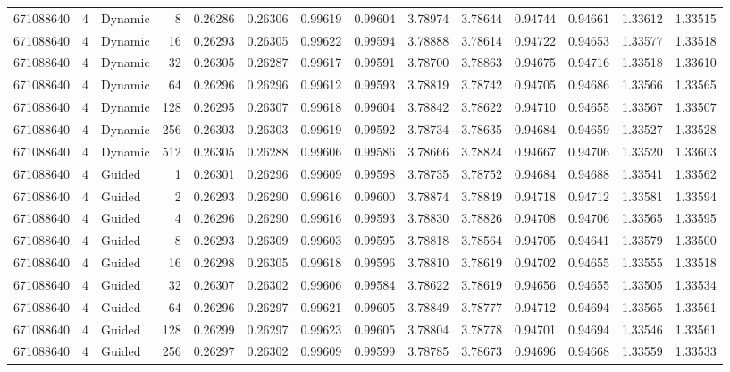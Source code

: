 \begin{tabular}{rrlrrrrrrrrrrr}
671088640 & 4 & Dynamic & 8 & 0.26286 & 0.26306 & 0.99619 & 0.99604 & 3.78974 & 3.78644 & 0.94744 & 0.94661 & 1.33612 & 1.33515 \\
671088640 & 4 & Dynamic & 16 & 0.26293 & 0.26305 & 0.99622 & 0.99594 & 3.78888 & 3.78614 & 0.94722 & 0.94653 & 1.33577 & 1.33518 \\
671088640 & 4 & Dynamic & 32 & 0.26305 & 0.26287 & 0.99617 & 0.99591 & 3.78700 & 3.78863 & 0.94675 & 0.94716 & 1.33518 & 1.33610 \\
671088640 & 4 & Dynamic & 64 & 0.26296 & 0.26296 & 0.99612 & 0.99593 & 3.78819 & 3.78742 & 0.94705 & 0.94686 & 1.33566 & 1.33565 \\
671088640 & 4 & Dynamic & 128 & 0.26295 & 0.26307 & 0.99618 & 0.99604 & 3.78842 & 3.78622 & 0.94710 & 0.94655 & 1.33567 & 1.33507 \\
671088640 & 4 & Dynamic & 256 & 0.26303 & 0.26303 & 0.99619 & 0.99592 & 3.78734 & 3.78635 & 0.94684 & 0.94659 & 1.33527 & 1.33528 \\
671088640 & 4 & Dynamic & 512 & 0.26305 & 0.26288 & 0.99606 & 0.99586 & 3.78666 & 3.78824 & 0.94667 & 0.94706 & 1.33520 & 1.33603 \\
671088640 & 4 & Guided & 1 & 0.26301 & 0.26296 & 0.99609 & 0.99598 & 3.78735 & 3.78752 & 0.94684 & 0.94688 & 1.33541 & 1.33562 \\
671088640 & 4 & Guided & 2 & 0.26293 & 0.26290 & 0.99616 & 0.99600 & 3.78874 & 3.78849 & 0.94718 & 0.94712 & 1.33581 & 1.33594 \\
671088640 & 4 & Guided & 4 & 0.26296 & 0.26290 & 0.99616 & 0.99593 & 3.78830 & 3.78826 & 0.94708 & 0.94706 & 1.33565 & 1.33595 \\
671088640 & 4 & Guided & 8 & 0.26293 & 0.26309 & 0.99603 & 0.99595 & 3.78818 & 3.78564 & 0.94705 & 0.94641 & 1.33579 & 1.33500 \\
671088640 & 4 & Guided & 16 & 0.26298 & 0.26305 & 0.99618 & 0.99596 & 3.78810 & 3.78619 & 0.94702 & 0.94655 & 1.33555 & 1.33518 \\
671088640 & 4 & Guided & 32 & 0.26307 & 0.26302 & 0.99606 & 0.99584 & 3.78622 & 3.78619 & 0.94656 & 0.94655 & 1.33505 & 1.33534 \\
671088640 & 4 & Guided & 64 & 0.26296 & 0.26297 & 0.99621 & 0.99605 & 3.78849 & 3.78777 & 0.94712 & 0.94694 & 1.33565 & 1.33561 \\
671088640 & 4 & Guided & 128 & 0.26299 & 0.26297 & 0.99623 & 0.99605 & 3.78804 & 3.78778 & 0.94701 & 0.94694 & 1.33546 & 1.33561 \\
671088640 & 4 & Guided & 256 & 0.26297 & 0.26302 & 0.99609 & 0.99599 & 3.78785 & 3.78673 & 0.94696 & 0.94668 & 1.33559 & 1.33533 \\

\end{tabular}
